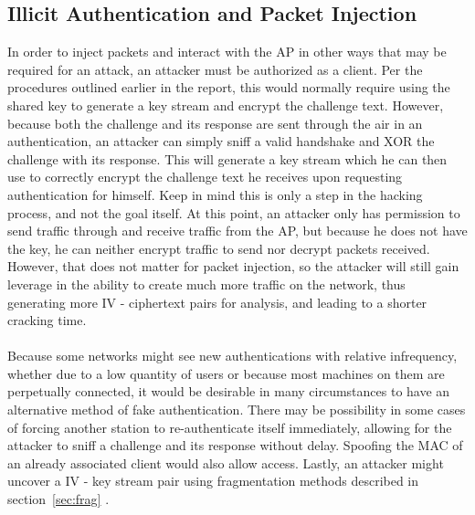 \documentclass[12pt]{article}
\begin{document}
\subsection{Illicit Authentication and Packet Injection}
In order to inject packets and interact with the AP in other ways that may be required for an attack, an attacker must be authorized as a client.  Per the procedures outlined earlier in the report, this would normally require using the shared key to generate a key stream and encrypt the challenge text.  However, because both the challenge and its response are sent through the air in an authentication, an attacker can simply sniff a valid handshake and XOR the challenge with its response.  This will generate a key stream which he can then use to correctly encrypt the challenge text he receives upon requesting authentication for himself.  Keep in mind this is only a step in the hacking process, and not the goal itself.  At this point, an attacker only has permission to send traffic through and receive traffic from the AP, but because he does not have the key, he can neither encrypt traffic to send nor decrypt packets received.  However, that does not matter for packet injection, so the attacker will still gain leverage in the ability to create much more traffic on the network, thus generating more IV - ciphertext pairs for analysis, and leading to a shorter cracking time.
\\\\
Because some networks might see new authentications with relative infrequency, whether due to a low quantity of users or because most machines on them are perpetually connected, it would be desirable in many circumstances to have an alternative method of fake authentication.  There may be possibility in some cases of forcing another station to re-authenticate itself immediately, allowing for the attacker to sniff a challenge and its response without delay.  Spoofing the MAC of an already associated client would also allow access.  Lastly, an attacker might uncover a IV - key stream pair using fragmentation methods described in section~\ref{sec:frag} .
\end{document}
